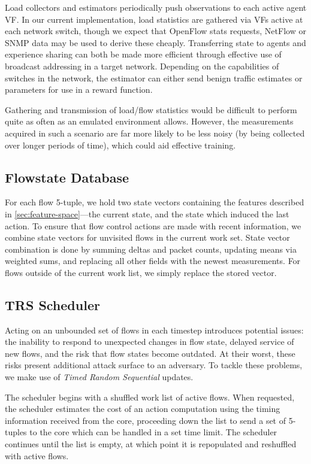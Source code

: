\documentclass[10pt, times, conference, letterpaper]{IEEEtran}
\begin{document}
Load collectors and estimators periodically push observations to each active agent VF.
In our current implementation, load statistics are gathered via VFs active at each network switch, though we expect that OpenFlow stats requests, NetFlow or SNMP data may be used to derive these cheaply.
Transferring state to agents and experience sharing can both be made more efficient through effective use of broadcast addressing in a target network.
Depending on the capabilities of switches in the network, the estimator can either send benign traffic estimates or parameters for use in a reward function.

Gathering and transmission of load/flow statistics would be difficult to perform quite as often as an emulated environment allows.
However, the measurements acquired in such a scenario are far more likely to be less noisy (by being collected over longer periods of time), which could aid effective training.

\subsection{Flowstate Database}
For each flow 5-tuple, we hold two state vectors containing the features described in \cref{sec:feature-space}---the current state, and the state which induced the last action.
To ensure that flow control actions are made with recent information, we combine state vectors for unvisited flows in the current work set.
State vector combination is done by summing deltas and packet counts, updating means via weighted sums, and replacing all other fields with the newest measurements.
For flows outside of the current work list, we simply replace the stored vector.

\subsection{TRS Scheduler}
Acting on an unbounded set of flows in each timestep introduces potential issues: the inability to respond to unexpected changes in flow state, delayed service of new flows, and the risk that flow states become outdated.
At their worst, these risks present additional attack surface to an adversary.
To tackle these problems, we make use of \emph{Timed Random Sequential} updates.

The scheduler begins with a shuffled work list of active flows.
When requested, the scheduler estimates the cost of an action computation using the timing information received from the core, proceeding down the list to send a set of 5-tuples to the core which can be handled in a set time limit.
The scheduler continues until the list is empty, at which point it is repopulated and reshuffled with active flows.
\end{document}
